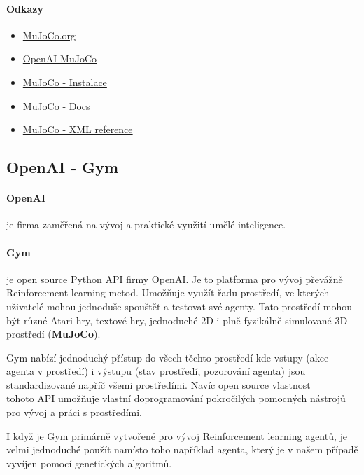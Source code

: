 \documentclass[a4paper, 12pt]{article}
\begin{document}
\paragraph{Odkazy} 
\begin{itemize}
    \item \href{https://mujoco.org/}{MuJoCo.org}
    \item \href{https://openai.com/blog/faster-robot-simulation-in-python}{OpenAI MuJoCo} 
    \item \href{https://neptune.ai/blog/installing-mujoco-to-work-with-openai-gym-environments}{MuJoCo - Instalace} 
    \item \href{https://mujoco.readthedocs.io/en/latest/overview.html}{MuJoCo - Docs} 
    \item \href{https://mujoco.readthedocs.io/en/latest/XMLreference.html}{MuJoCo - XML reference} 
\end{itemize}

\newpage

\subsection{OpenAI - Gym}
\paragraph{OpenAI} je firma zaměřená na vývoj a praktické využití umělé inteligence.  
\paragraph{Gym} je open source Python API firmy OpenAI. Je to platforma pro vývoj převážně
Reinforcement learning metod. Umožňuje využít řadu prostředí, ve kterých
uživatelé mohou jednoduše spouštět a testovat své agenty. Tato prostředí mohou
být různé Atari hry, textové hry, jednoduché 2D i plně fyzikálně simulované 3D
prostředí (\textbf {MuJoCo}).

Gym nabízí jednoduchý přístup do všech těchto prostředí kde vstupy (akce agenta
v prostředí) i výstupu (stav prostředí, pozorování agenta) jsou standardizované
napříč všemi prostředími. Navíc open source vlastnost \\tohoto API umožňuje
vlastní doprogramování pokročilých pomocných nástrojů pro vývoj a práci s 
prostředími.

I když je Gym primárně vytvořené pro vývoj Reinforcement learning agentů, je
velmi jednoduché použít namísto toho například agenta, který je v našem případě
vyvíjen pomocí genetických algoritmů.
\end{document}

